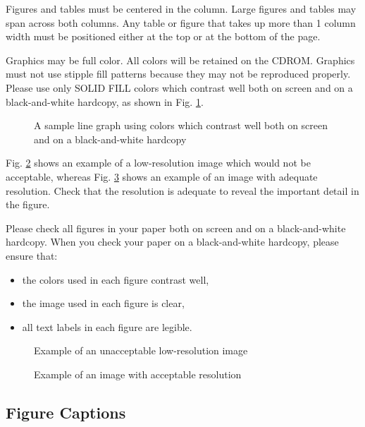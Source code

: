 Figures and tables must be centered in the column.  Large figures and
tables may span across both columns.  Any table or figure that takes
up more than 1 column width must be positioned either at the top or at
the bottom of the page.

Graphics may be full color.  All colors will be retained on the CDROM.
Graphics must not use stipple fill patterns because they may not be
reproduced properly.  Please use only SOLID FILL colors which contrast
well both on screen and on a black-and-white hardcopy, as shown in
Fig.  \ref{fig:sample_graph}.

\begin{figure}[h]
	\centerline{ }
	\caption{A sample line graph using colors which contrast well both on screen and on a black-and-white hardcopy}
	\label{fig:sample_graph}
\end{figure}

Fig. \ref{fig:lores-photo} shows an example of a low-resolution image
which would not be acceptable, whereas Fig.  \ref{fig:hires-photo}
shows an example of an image with adequate resolution.  Check that the
resolution is adequate to reveal the important detail in the figure.

Please check all figures in your paper both on screen and on a
black-and-white hardcopy.  When you check your paper on a
black-and-white hardcopy, please ensure that:

\begin{itemize}
\item	the colors used in each figure contrast well,
\item	the image used in each figure is clear,
\item	all text labels in each figure are legible.
\end{itemize}

\begin{figure}[h]
	\centerline{ }
	\caption{Example of an unacceptable low-resolution image}
	\label{fig:lores-photo}
\end{figure}

\begin{figure}[h]
	\centerline{ }
	\caption{Example of an image with acceptable resolution}
	\label{fig:hires-photo}
\end{figure}

\subsection{Figure Captions}

